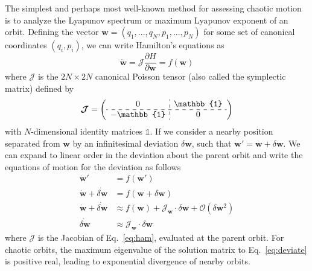 \documentclass[letterpaper,12pt,preprint]{aastex}
\newcommand{\bs}[1]{\boldsymbol{#1}}
\newcommand{\ident}{\mathbb{1}}
\newcommand{\jac}{\mathscr{J}}
\begin{document}
The simplest and perhaps most well-known method for assessing chaotic motion is to analyze the Lyapunov spectrum or maximum Lyapunov exponent of an orbit. Defining the vector $\bs{w} = (q_1,...,q_N,p_1,...,p_N)$ for some set of canonical coordinates $(q_i,p_i)$, we can write Hamilton's equations as 
\begin{equation}
	\dot{\bs{w}} = \bs{\mathcal{J}} \frac{\partial H}{\partial \bs{w}} = f(\bs{w}) \label{eq:ham}
\end{equation}
where $\bs{\mathcal{J}}$ is the $2N \times 2N$ canonical Poisson tensor (also called the symplectic matrix) defined by
\begin{equation}
	\bs{\mathcal{J}} = \left( \begin{array}{c:c} 0 & \ident \\ \hdashline -\ident & 0 \end{array} \right)
\end{equation}
with $N$-dimensional identity matrices $\ident$. If we consider a nearby position separated from $\bs{w}$ by an infinitesimal deviation $\delta \bs{w}$, such that $\bs{w}' = \bs{w} + \delta \bs{w}$. We can expand to linear order in the deviation about the parent orbit and write the equations of motion for the deviation as follows
\begin{align}
	\dot{\bs{w}}' &= f(\bs{w}')\\
	\dot{\bs{w}} + \dot{\delta \bs{w}} &= f(\bs{w} +  \delta \bs{w})\\
	\dot{\bs{w}} + \dot{\delta \bs{w}} &\approx f(\bs{w}) + \jac_{\bs{w}}\cdot\delta \bs{w} + \mathcal{O}(\delta \bs{w}^2)\\
	\dot{\delta \bs{w}} &\approx \jac_{\bs{w}} \cdot  \delta \bs{w}\label{eq:deviate}
\end{align}
where $\jac$ is the Jacobian of Eq.~\ref{eq:ham}, evaluated at the parent orbit. For chaotic orbits, the maximum eigenvalue of the solution matrix to Eq.~\ref{eq:deviate} is positive real, leading to exponential divergence of nearby orbits. 
\end{document}
